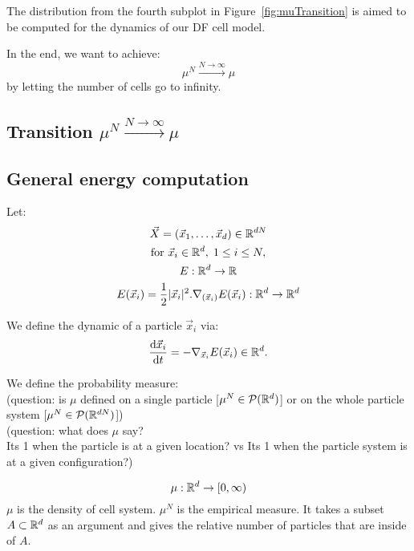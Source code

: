 The distribution from the fourth subplot in Figure~\ref{fig:muTransition} is aimed to be computed for the dynamics of our DF cell model. 

In the end, we want to achieve:
\[ \mu^N \xrightarrow{N \to \infty} \mu\]
by letting the number of cells go to infinity. \\

\subsection{Transition $\mu^N \xrightarrow{N \to \infty} \mu$ }


\subsection{General energy computation}

Let:
\begin{gather*}
    \vec{X} = (\vec{x}_1, \ldots, \vec{x}_d) \in \mathbb{R}^{dN} \\
    \text{for } \vec{x}_i \in \mathbb{R}^d, \; 1 \leq i \leq N, \\
    E: \mathbb{R}^d \rightarrow \mathbb{R} \\ 
    E(\vec{x}_i) = \frac{1}{2} |\vec{x}_i|^2.
    \nabla_{(\vec{x}_i)} E(\vec{x}_i): \mathbb{R}^d \rightarrow \mathbb{R}^d
\end{gather*}

We define the dynamic of a particle $\vec{x}_i$ via: \\
\[ \dfrac{\mathrm{d} \vec{x}_i}{\mathrm{d} t} = - \nabla_{\vec{x}_i} E(\vec{x}_i) \in \mathbb{R}^{d}. \]

We define the probability measure:\\
(question: is $\mu$ defined on a single particle [$\mu^{N} \in \mathcal{P}(\mathbb{R}^d)$] or on the whole particle system [$\mu^{N} \in \mathcal{P}(\mathbb{R}^{dN})$]) \\
(question: what does $\mu$ say? \\
Its 1 when the particle is at a given location? vs Its 1 when the particle system is at a given configuration?)

\[ \mu: \mathbb{R}^d \rightarrow [0,\infty)  \]
$\mu$ is the density of cell system.
$\mu^N$ is the empirical measure. 
It takes a subset $A \subset \mathbb{R}^d$ as an argument and gives the relative number of particles that are inside of $A$. 


